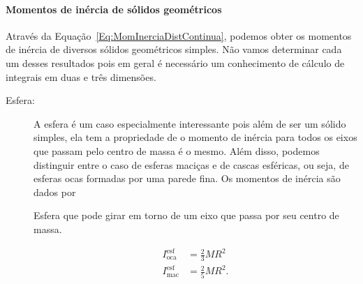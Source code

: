 \paragraph{Momentos de inércia de sólidos geométricos}

Através da Equação~\eqref{Eq:MomInerciaDistContinua}, podemos obter os momentos de inércia de diversos sólidos geométricos simples. Não vamos determinar cada um desses resultados pois em geral é necessário um conhecimento de cálculo de integrais em duas e três dimensões.

\begin{description}

    \item[Esfera:] A esfera é um caso especialmente interessante pois além de ser um sólido simples, ela tem a propriedade de o momento de inércia para todos os eixos que passam pelo centro de massa é o mesmo. Além disso, podemos distinguir entre o caso de esferas maciças e de cascas esféricas, ou seja, de esferas ocas formadas por uma parede fina. Os momentos de inércia são dados por
\begin{marginfigure}[-5mm]
\centering
{}
\caption{Esfera que pode girar em torno de um eixo que passa por seu centro de massa.}
\end{marginfigure}  
        \begin{align}
            I^{\textrm{esf}}_{\textrm{oca}} &= \frac{2}{3} MR^2 \\
            I^{\textrm{esf}}_{\textrm{mac}} &= \frac{2}{5} MR^2.
        \end{align}
           

\end{description}
